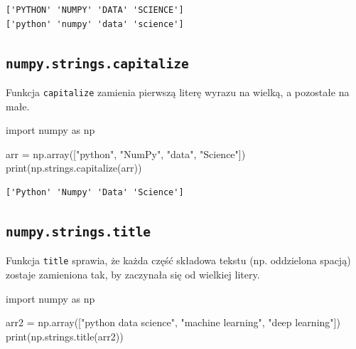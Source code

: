 \documentclass[
  polish,
  letterpaper,
  DIV=11,
  numbers=noendperiod]{scrreprt}
\newenvironment{Shaded}{\begin{snugshade}}{\end{snugshade}}
\newcommand{\BuiltInTok}[1]{\textcolor[rgb]{0.00,0.23,0.31}{#1}}
\newcommand{\ImportTok}[1]{\textcolor[rgb]{0.00,0.46,0.62}{#1}}
\newcommand{\NormalTok}[1]{\textcolor[rgb]{0.00,0.23,0.31}{#1}}
\newcommand{\OperatorTok}[1]{\textcolor[rgb]{0.37,0.37,0.37}{#1}}
\newcommand{\StringTok}[1]{\textcolor[rgb]{0.13,0.47,0.30}{#1}}
\begin{document}
\begin{verbatim}
['PYTHON' 'NUMPY' 'DATA' 'SCIENCE']
['python' 'numpy' 'data' 'science']
\end{verbatim}

\subsection{\texorpdfstring{\texttt{numpy.strings.capitalize}}{numpy.strings.capitalize}}\label{numpy.strings.capitalize}

Funkcja \texttt{capitalize} zamienia pierwszą literę wyrazu na wielką, a
pozostałe na małe.

\begin{Shaded}
\begin{Highlighting}[]
\ImportTok{import}\NormalTok{ numpy }\ImportTok{as}\NormalTok{ np}

\NormalTok{arr }\OperatorTok{=}\NormalTok{ np.array([}\StringTok{"python"}\NormalTok{, }\StringTok{"NumPy"}\NormalTok{, }\StringTok{"data"}\NormalTok{, }\StringTok{"Science"}\NormalTok{])}
\BuiltInTok{print}\NormalTok{(np.strings.capitalize(arr))}
\end{Highlighting}
\end{Shaded}

\begin{verbatim}
['Python' 'Numpy' 'Data' 'Science']
\end{verbatim}

\subsection{\texorpdfstring{\texttt{numpy.strings.title}}{numpy.strings.title}}\label{numpy.strings.title}

Funkcja \texttt{title} sprawia, że każda część składowa tekstu (np.
oddzielona spacją) zostaje zamieniona tak, by zaczynała się od wielkiej
litery.

\begin{Shaded}
\begin{Highlighting}[]
\ImportTok{import}\NormalTok{ numpy }\ImportTok{as}\NormalTok{ np}

\NormalTok{arr2 }\OperatorTok{=}\NormalTok{ np.array([}\StringTok{"python data science"}\NormalTok{, }\StringTok{"machine learning"}\NormalTok{, }\StringTok{"deep learning"}\NormalTok{])}
\BuiltInTok{print}\NormalTok{(np.strings.title(arr2))}
\end{Highlighting}
\end{Shaded}
\end{document}
